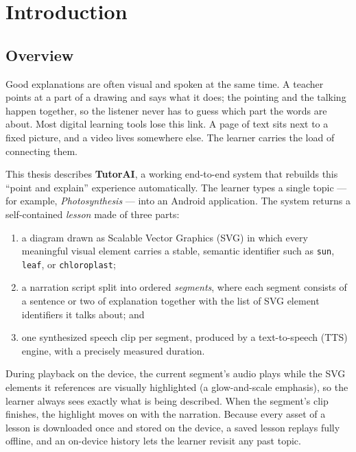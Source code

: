 \chapter{Introduction}
\label{ch:intro}

\section{Overview}
\label{sec:overview}

Good explanations are often visual and spoken at the same time. A teacher
points at a part of a drawing and says what it does; the pointing and the
talking happen together, so the listener never has to guess which part the
words are about. Most digital learning tools lose this link. A page of text
sits next to a fixed picture, and a video lives somewhere else. The learner
carries the load of connecting them.

This thesis describes \textbf{TutorAI}, a working end-to-end system that
rebuilds this ``point and explain'' experience automatically. The learner
types a single topic --- for example, \emph{Photosynthesis} --- into an
Android application. The system returns a self-contained \emph{lesson} made of
three parts:

\begin{enumerate}
  \item a diagram drawn as Scalable Vector Graphics (SVG) in which every
        meaningful visual element carries a stable, semantic identifier such
        as \texttt{sun}, \texttt{leaf}, or \texttt{chloroplast};
  \item a narration script split into ordered \emph{segments}, where each
        segment consists of a sentence or two of explanation together with the
        list of SVG element identifiers it talks about; and
  \item one synthesized speech clip per segment, produced by a text-to-speech
        (TTS) engine, with a precisely measured duration.
\end{enumerate}

During playback on the device, the current segment's audio plays while the SVG
elements it references are visually highlighted (a glow-and-scale emphasis),
so the learner always sees exactly what is being described. When the segment's
clip finishes, the highlight moves on with the narration. Because every asset
of a lesson is downloaded once and stored on the device, a saved lesson
replays fully offline, and an on-device history lets the learner revisit any
past topic.

